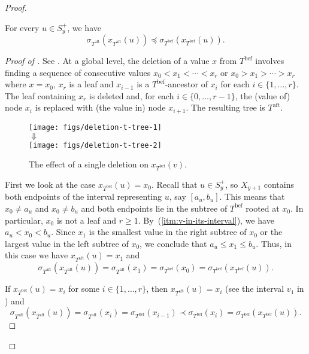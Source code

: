 \documentclass[kpfonts]{patmorin}
\let\leq\leqslant
\let\geq\geqslant
\let\preceq\preccurlyeq
\newcommand{\itemref}[1]{(\ref{#1})}
\begin{document}
\begin{proof}
  \begin{clm}
  For every $u\in S^+_y$, we have
  \[
  \sigma_{T^{\text{aft}}}(x_{T^{\text{aft}}}(u))\preceq\sigma_{T^{\text{bef}}}(x_{T^{\text{bef}}}(u)).
  \]
  \end{clm}

  \begin{proof}[Proof of ]
    See .  At a global level, the deletion of a value $x$ from $T^{\text{bef}}$ involves finding a sequence of consecutive values $x_0<x_1<\cdots<x_r$ or $x_0>x_1>\cdots>x_r$ where $x=x_0$, $x_r$ is a leaf and $x_{i-1}$ is a $T^{\text{bef}}$-ancestor of $x_{i}$ for each $i\in\{1,\dots,r\}$.  The leaf containing $x_r$ is deleted and, for each $i\in\{0,\dots,r-1\}$, the (value of) node $x_i$ is replaced with (the value in) node $x_{i+1}$. 
    The resulting tree is $T^{\text{aft}}$.    
    \begin{figure}
      \begin{center}
        \texttt{[image: figs/deletion-t-tree-1]}\\[1ex]
        $\Downarrow$\\[1ex]
        \texttt{[image: figs/deletion-t-tree-2]}
      \end{center}
      \caption{The effect of a single deletion on $x_{T^{\text{bef}}}(v)$.}
    \end{figure}

    First we look at the case $x_{T^{\text{bef}}}(u)=x_0$. 
    Recall that $u\in S^+_y$, so $X_{y+1}$ contains both endpoints of the interval representing $u$, say $[a_u,b_u]$. 
    This means that $x_0\neq a_u$ and $x_0\neq b_u$ and both endpoints lie in the subtree of $T^{\text{bef}}$ rooted at $x_0$. 
    In particular, $x_0$ is not a leaf and $r\geq 1$. 
    By~\itemref{itm:v-in-its-interval}, we have $a_u < x_0 < b_u$. 
    Since $x_1$ is the smallest value in the right subtree of $x_0$ or the largest value in the left subtree of $x_0$, we conclude that 
    $a_u\leq x_1\leq b_u$. 
    Thus, in this case we have $x_{T^{\text{aft}}}(u)=x_1$ and
    \[
    \sigma_{T^{\text{aft}}}(x_{T^{\text{aft}}}(u)) = \sigma_{T^{\text{aft}}}(x_1) = \sigma_{T^{\text{bef}}}(x_0) = \sigma_{T^{\text{bef}}}(x_{T^{\text{bef}}}(u)).
    \]

    If $x_{T^{\text{bef}}}(u)=x_i$ for some $i\in\{1,\dots,r\}$, 
    then $x_{T^{\text{aft}}}(u)=x_i$ (see the interval $v_1$ in ) and 
    \[
    \sigma_{T^{\text{aft}}}(x_{T^{\text{aft}}}(u))= \sigma_{T^{\text{aft}}}(x_i) = \sigma_{T^{\text{bef}}}(x_{i-1}) \prec \sigma_{T^{\text{bef}}}(x_{i}) = \sigma_{T^{\text{bef}}}(x_{T^{\text{bef}}}(u)).\]


\end{proof}
\end{proof}
\end{document}

